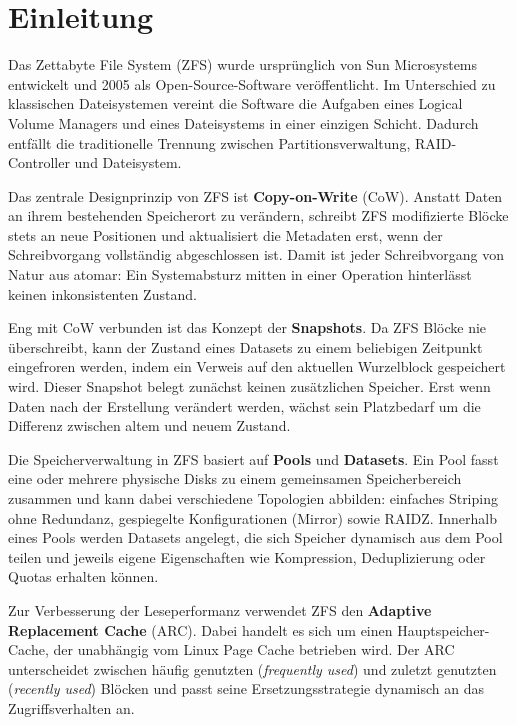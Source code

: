 \documentclass[a4paper, 12pt]{article}
\begin{document}
\section{Einleitung}

Das Zettabyte File System (ZFS) wurde ursprünglich von Sun Microsystems entwickelt und 2005 als Open-Source-Software veröffentlicht.\autocite{sliwa2022zfs} Im Unterschied zu klassischen Dateisystemen vereint die Software die Aufgaben eines Logical Volume Managers und eines Dateisystems in einer einzigen Schicht. Dadurch entfällt die traditionelle Trennung zwischen Partitionsverwaltung, RAID-Controller und Dateisystem.

Das zentrale Designprinzip von ZFS ist \textbf{Copy-on-Write} (CoW).\autocite{wikipedia2025zfs} Anstatt Daten an ihrem bestehenden Speicherort zu verändern, schreibt ZFS modifizierte Blöcke stets an neue Positionen und aktualisiert die Metadaten erst, wenn der Schreibvorgang vollständig abgeschlossen ist. Damit ist jeder Schreibvorgang von Natur aus atomar: Ein Systemabsturz mitten in einer Operation hinterlässt keinen inkonsistenten Zustand.

Eng mit CoW verbunden ist das Konzept der \textbf{Snapshots}. Da ZFS Blöcke nie überschreibt, kann der Zustand eines Datasets zu einem beliebigen Zeitpunkt eingefroren werden, indem ein Verweis auf den aktuellen Wurzelblock gespeichert wird. Dieser Snapshot belegt zunächst keinen zusätzlichen Speicher. Erst wenn Daten nach der Erstellung verändert werden, wächst sein Platzbedarf um die Differenz zwischen altem und neuem Zustand.

Die Speicherverwaltung in ZFS basiert auf \textbf{Pools} und \textbf{Datasets}. Ein Pool fasst eine oder mehrere physische Disks zu einem gemeinsamen Speicherbereich zusammen und kann dabei verschiedene Topologien abbilden: einfaches Striping ohne Redundanz, gespiegelte Konfigurationen (Mirror) sowie RAIDZ. Innerhalb eines Pools werden Datasets angelegt, die sich Speicher dynamisch aus dem Pool teilen und jeweils eigene Eigenschaften wie Kompression, Deduplizierung oder Quotas erhalten können.

Zur Verbesserung der Leseperformanz verwendet ZFS den \textbf{Adaptive Replacement Cache} (ARC). Dabei handelt es sich um einen Hauptspeicher-Cache, der unabhängig vom Linux Page Cache betrieben wird. Der ARC unterscheidet zwischen häufig genutzten (\emph{frequently used}) und zuletzt genutzten (\emph{recently used}) Blöcken und passt seine Ersetzungsstrategie dynamisch an das Zugriffsverhalten an.
\end{document}
